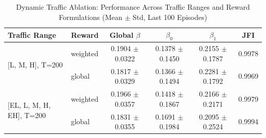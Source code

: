 \begin{table}[!t]
\caption{Dynamic Traffic Ablation: Performance Across Traffic Ranges and Reward Formulations (Mean $\pm$ Std, Last 100 Episodes)}
\label{tab:dynamic_ablation}
\centering
\begin{tabular}{@{}llcccc@{}}
\toprule
\textbf{Traffic Range} & \textbf{Reward} & \textbf{Global $\beta$} & \textbf{$\beta_0$} & \textbf{$\beta_1$} & \textbf{JFI} \\
\midrule
\multirow{2}{*}{[L, M, H], T=200}
  & weighted  & 0.1904 $\pm$ 0.0322 & 0.1378 $\pm$ 0.1450 & 0.2155 $\pm$ 0.1787 & 0.9978 \\
  & global  & 0.1817 $\pm$ 0.0329 & 0.1366 $\pm$ 0.1494 & 0.2281 $\pm$ 0.1792 & 0.9969 \\
\midrule
\multirow{2}{*}{[EL, L, M, H, EH], T=200}
  & weighted  & 0.1966 $\pm$ 0.0357 & 0.1418 $\pm$ 0.1867 & 0.2166 $\pm$ 0.2171 & 0.9979 \\
  & global  & 0.1831 $\pm$ 0.0355 & 0.1691 $\pm$ 0.1984 & 0.2095 $\pm$ 0.2524 & 0.9994 \\
\bottomrule
\end{tabular}
\end{table}
